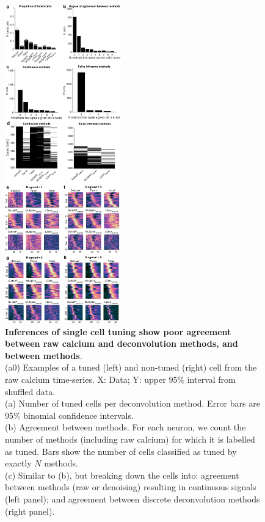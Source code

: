 \documentclass[a4paper,11pt]{article}
\begin{document}
\begin{figure}
	\centering
\includegraphics[width=0.45\textwidth]{composite_figs/fig5_tuned_cells.png}
\caption{\label{fig:tuned_cells} \textbf{Inferences of single cell tuning show poor agreement between raw calcium and deconvolution methods, and between methods}. \\
	(a0) Examples of a tuned (left) and non-tuned (right) cell from the raw calcium time-series. X: Data; Y: upper 95\% interval from shuffled data.  \\
	(a) Number of tuned cells per deconvolution method. Error bars are 95\% binomial confidence intervals. \\ 
	(b) Agreement between methods. For each neuron, we count the number of methods (including raw calcium) for which it is labelled as tuned. Bars show the number of cells classified as tuned by exactly $N$ methods. \\
	(c) Similar to (b), but breaking down the cells into: agreement between methods (raw or denoising) resulting in continuous signals (left panel); and agreement between discrete deconvolution methods (right panel). \\ 
}
\end{figure}
\end{document}
